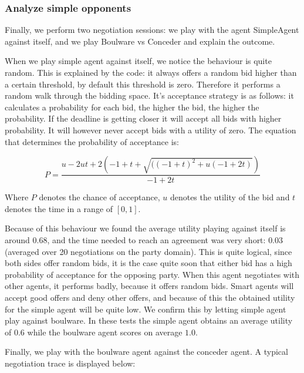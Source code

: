 \documentclass[a4paper,10pt]{article}
\begin{document}
\subsubsection{Analyze simple opponents}

Finally, we perform two negotiation sessions: we play with the agent SimpleAgent against
itself, and we play Boulware vs Conceder and explain the outcome. 

When we play simple agent against itself, we notice the behaviour is quite random.
This is explained by the code: it always offers a random bid higher than a certain threshold,
by default this threshold is zero. Therefore it performs a random walk through the 
bidding space. It's acceptance strategy is as follows: it calculates a probability for each bid, the higher the bid, the higher the probability. If the deadline is getting closer it will accept all bids with higher probability. It will however never accept bids with a utility of zero. The equation that determines the 
probability of acceptance is:

\begin{equation}
P = \frac{u - 2ut + 2(-1 + t + \sqrt{((-1 + t)^2 + u(-1 + 2t)})}{-1 + 2t}
\end{equation}

Where $P$ denotes the chance of acceptance, $u$ denotes the utility of the bid and $t$ denotes the time in a range of $[0,1]$.

Because of this behaviour we found the average utility playing against itself is around $0.68$, and the
time needed to reach an agreement was very short: $0.03$ (averaged
over 20 negotiations on the party domain).
This is quite logical, since both sides offer random bids, it is the
case quite soon that either bid has a high probability of acceptance for the opposing party.
When this agent negotiates with other agents, it performs badly, because
it offers random bids. Smart agents will accept good offers and deny other offers,
and because of this the obtained utility for the simple agent will be quite low.
We confirm this by letting simple agent play against boulware. In these tests the simple agent obtains 
an average utility of $0.6$ while the boulware agent scores on average $1.0$.

Finally, we play with the boulware agent against the conceder agent. A typical negotiation trace is displayed below:
\end{document}
